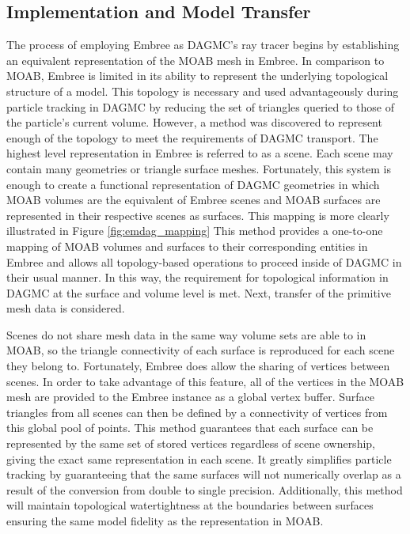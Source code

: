 \subsection{Implementation and Model Transfer}\label{sec:emdag_transfer}

The process of employing Embree as DAGMC's ray tracer begins by establishing an
equivalent representation of the MOAB mesh in Embree. In comparison to MOAB,
Embree is limited in its ability to represent the underlying topological
structure of a model. This topology is necessary and used advantageously during
particle tracking in DAGMC by reducing the set of triangles queried to those of
the particle's current volume. However, a method was discovered to represent
enough of the topology to meet the requirements of DAGMC transport. The highest
level representation in Embree is referred to as a scene. Each scene may contain
many geometries or triangle surface meshes. Fortunately, this system is enough
to create a functional representation of DAGMC geometries in which MOAB volumes
are the equivalent of Embree scenes and MOAB surfaces are represented in their
respective scenes as surfaces. This mapping is more clearly illustrated in Figure
\ref{fig:emdag_mapping} This method provides a one-to-one mapping of MOAB
volumes and surfaces to their corresponding entities in Embree and allows all
topology-based operations to proceed inside of DAGMC in their usual manner. In
this way, the requirement for topological information in DAGMC at the surface
and volume level is met. Next, transfer of the primitive mesh data is
considered.

Scenes do not share mesh data in the same way volume sets are able to in MOAB,
so the triangle connectivity of each surface is reproduced for each scene they
belong to. Fortunately, Embree does allow the sharing of vertices between
scenes. In order to take advantage of this feature, all of the vertices in the
MOAB mesh are provided to the Embree instance as a global vertex buffer. Surface
triangles from all scenes can then be defined by a connectivity of vertices from
this global pool of points. This method guarantees that each surface can be
represented by the same set of stored vertices regardless of scene ownership,
giving the exact same representation in each scene. It greatly simplifies
particle tracking by guaranteeing that the same surfaces will not numerically
overlap as a result of the conversion from double to single
precision. Additionally, this method will maintain topological watertightness at
the boundaries between surfaces ensuring the same model fidelity as the
representation in MOAB.

